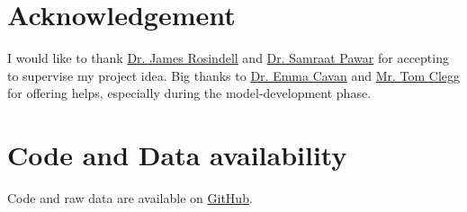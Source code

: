 \documentclass[../thesis.tex]{subfiles} %
\begin{document}
\section{Acknowledgement}
I would like to thank \href{mailto:j.rosindell@imperial.ac.uk}{Dr. James Rosindell} and \href{mailto:s.pawar@imperial.ac.uk}{Dr. Samraat Pawar} for accepting to supervise my project idea.  
Big thanks to \href{mailto:e.cavan@imperial.ac.uk}{Dr. Emma Cavan} and \href{mailto:t.clegg17@imperial.ac.uk}{Mr. Tom Clegg} for offering helps, especially during the model-development phase.


\section{Code and Data availability}
Code and raw data are available on \href{https://github.com/ph-u/Project}{GitHub}.
\end{document}
